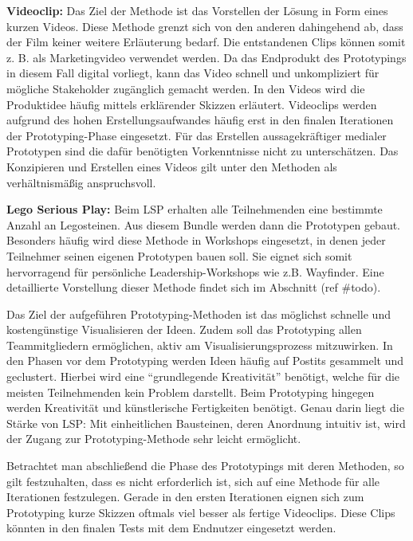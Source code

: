 \textbf{Videoclip:} Das Ziel der Methode ist das Vorstellen der Lösung in Form eines kurzen Videos. Diese Methode grenzt sich von den anderen dahingehend ab, dass der Film keiner weitere Erläuterung bedarf. Die entstandenen Clips können somit z. B. als Marketingvideo verwendet werden. Da das Endprodukt des Prototypings in diesem Fall digital vorliegt, kann das Video schnell und unkompliziert für mögliche Stakeholder zugänglich gemacht werden. In den Videos wird die Produktidee häufig mittels erklärender Skizzen erläutert. Videoclips werden aufgrund des hohen Erstellungsaufwandes häufig erst in den finalen Iterationen der Prototyping-Phase eingesetzt. Für das Erstellen aussagekräftiger medialer Prototypen sind die dafür benötigten Vorkenntnisse nicht zu unterschätzen. Das Konzipieren und Erstellen eines Videos gilt unter den Methoden als verhältnismäßig anspruchsvoll. 

\textbf{Lego Serious Play: } Beim LSP erhalten alle Teilnehmenden eine bestimmte Anzahl an Legosteinen. Aus diesem Bundle werden dann die Prototypen gebaut. Besonders häufig wird diese Methode in Workshops eingesetzt, in denen jeder Teilnehmer seinen eigenen Prototypen bauen soll. Sie eignet sich somit hervorragend für persönliche Leadership-Workshops wie z.B. Wayfinder. Eine detaillierte Vorstellung dieser Methode findet sich im Abschnitt (ref \#todo). \newline

Das Ziel der aufgeführen Prototyping-Methoden ist das möglichst schnelle und kostengünstige Visualisieren der Ideen. Zudem soll das Prototyping allen Teammitgliedern ermöglichen, aktiv am Visualisierungsprozess mitzuwirken. In den Phasen vor dem Prototyping werden Ideen häufig auf Postits gesammelt und geclustert. Hierbei wird eine ``grundlegende Kreativität'' benötigt, welche für die meisten Teilnehmenden kein Problem darstellt. Beim Prototyping hingegen werden Kreativität und künstlerische Fertigkeiten benötigt. Genau darin liegt die Stärke von LSP: Mit einheitlichen Bausteinen, deren Anordnung intuitiv ist, wird der Zugang zur Prototyping-Methode sehr leicht ermöglicht.

Betrachtet man abschließend die Phase des Prototypings mit deren Methoden, so gilt festzuhalten, dass es nicht erforderlich ist, sich auf eine Methode für alle Iterationen festzulegen. Gerade in den ersten Iterationen eignen sich zum Prototyping kurze Skizzen oftmals viel besser als fertige Videoclips. Diese Clips könnten in den finalen Tests mit dem Endnutzer eingesetzt werden.



